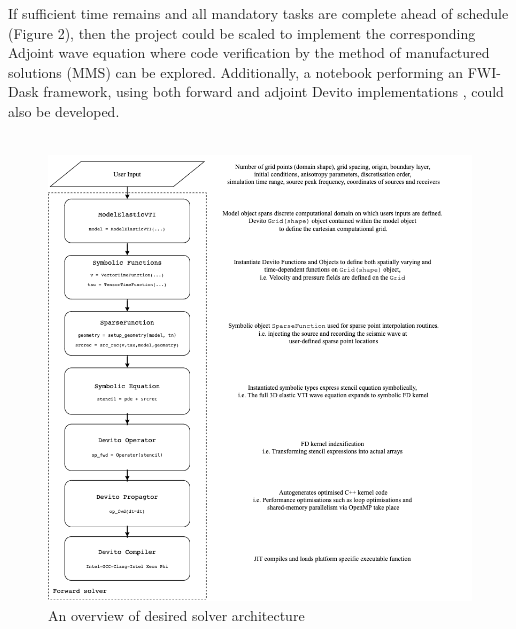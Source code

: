 If sufficient time remains and all mandatory tasks are complete ahead of schedule (Figure 2), then the project could be scaled to implement the corresponding Adjoint wave equation where code verification by the method of manufactured solutions (MMS) \citep{salari2000code, ober2009method} can be explored. Additionally, a notebook performing an FWI-Dask framework, using both forward and adjoint Devito implementations \citep{FWI_part3}, could also be developed. \\
\\
\newpage
\begin{figure}[h!]
    \centering
    \includegraphics[width=1.0\textwidth]{project/Solver.png}
    \caption{An overview of desired solver architecture}
    \label{fig:solver}
\end{figure}

\newpage
